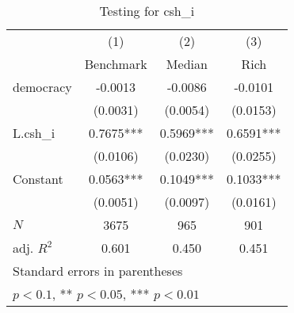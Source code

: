 \begin{table}[htbp]\centering
\def\sym#1{\ifmmode^{#1}\else\(^{#1}\)\fi}
\caption{Testing for csh\_i \label{tab:regression3}}
\begin{tabular}{l*{3}{c}}
\hline\hline
            &\multicolumn{1}{c}{(1)}&\multicolumn{1}{c}{(2)}&\multicolumn{1}{c}{(3)}\\
            &\multicolumn{1}{c}{Benchmark}&\multicolumn{1}{c}{Median}&\multicolumn{1}{c}{Rich}\\
\hline
democracy   &     -0.0013   &     -0.0086   &     -0.0101   \\
            &    (0.0031)   &    (0.0054)   &    (0.0153)   \\
[1em]
L.csh\_i     &      0.7675***&      0.5969***&      0.6591***\\
            &    (0.0106)   &    (0.0230)   &    (0.0255)   \\
[1em]
Constant    &      0.0563***&      0.1049***&      0.1033***\\
            &    (0.0051)   &    (0.0097)   &    (0.0161)   \\
\hline
\(N\)       &        3675   &         965   &         901   \\
adj. \(R^{2}\)&       0.601   &       0.450   &       0.451   \\
\hline\hline
\multicolumn{4}{l}{\footnotesize Standard errors in parentheses}\\
\multicolumn{4}{l}{\footnotesize * \(p<0.1\), ** \(p<0.05\), *** \(p<0.01\)}\\
\end{tabular}
\end{table}
